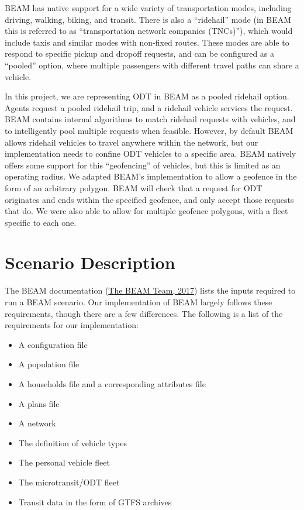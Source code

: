 \documentclass[
]{report}
\providecommand{\tightlist}{%
  \setlength{\itemsep}{0pt}\setlength{\parskip}{0pt}}
\begin{document}
BEAM has native support for a wide variety of transportation modes, including driving, walking, biking, and transit. There is also a ``ridehail'' mode (in BEAM this is referred to as ``transportation network companies (TNCs)''), which would include taxis and similar modes with non-fixed routes. These modes are able to respond to specific pickup and dropoff requests, and can be configured as a ``pooled'' option, where multiple passengers with different travel paths can share a vehicle.

In this project, we are representing ODT in BEAM as a pooled ridehail option. Agents request a pooled ridehail trip, and a ridehail vehicle services the request. BEAM contains internal algorithms to match ridehail requests with vehicles, and to intelligently pool multiple requests when feasible. However, by default BEAM allows ridehail vehicles to travel anywhere within the network, but our implementation needs to confine ODT vehicles to a specific area. BEAM natively offers some support for this ``geofencing'' of vehicles, but this is limited as an operating radius. We adapted BEAM's implementation to allow a geofence in the form of an arbitrary polygon. BEAM will check that a request for ODT originates and ends within the specified geofence, and only accept those requests that do. We were also able to allow for multiple geofence polygons, with a fleet specific to each one.

\hypertarget{scenario-description}{%
\section{Scenario Description}\label{scenario-description}}

The BEAM documentation (\protect\hyperlink{ref-beamdocs}{The BEAM Team, 2017}) lists the inputs required to run a BEAM scenario. Our implementation of BEAM largely follows these requirements, though there are a few differences. The following is a list of the requirements for our implementation:

\begin{itemize}
\tightlist
\item
  A configuration file
\item
  A population file
\item
  A households file and a corresponding attributes file
\item
  A plans file
\item
  A network
\item
  The definition of vehicle types
\item
  The personal vehicle fleet
\item
  The microtransit/ODT fleet
\item
  Transit data in the form of GTFS archives
\end{itemize}
\end{document}
